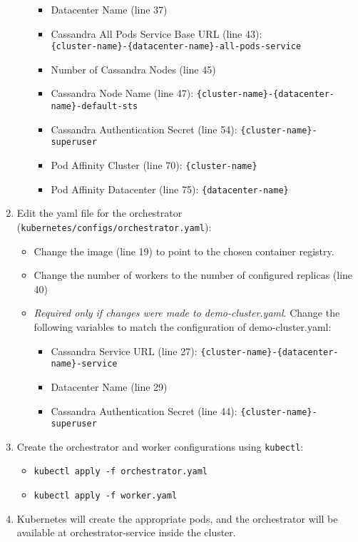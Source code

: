 \begin{enumerate}
\begin{itemize}
		\begin{itemize}
			\item Datacenter Name (line 37)
			\item Cassandra All Pods Service Base URL (line 43): \\ \texttt{\{cluster-name\}-\{datacenter-name\}-all-pods-service}
			\item Number of Cassandra Nodes (line 45)
			\item Cassandra Node Name (line 47): \texttt{\{cluster-name\}-\{datacenter-name\}-default-sts}
			\item Cassandra Authentication Secret (line 54): \texttt{\{cluster-name\}-superuser}
			\item Pod Affinity Cluster (line 70): \texttt{\{cluster-name\}}
			\item Pod Affinity Datacenter (line 75): \texttt{\{datacenter-name\}}
		\end{itemize}
	\end{itemize}
	\item Edit the yaml file for the orchestrator (\texttt{kubernetes/configs/orchestrator.yaml}):
	\begin{itemize}
		\item Change the image (line 19) to point to the chosen container registry.
		\item Change the number of workers to the number of configured replicas (line 40)
		\item \textit{Required only if changes were made to demo-cluster.yaml}. Change the following variables to match the configuration of demo-cluster.yaml:
		\begin{itemize}
			\item Cassandra Service URL (line 27): \texttt{\{cluster-name\}-\{datacenter-name\}-service}
			\item Datacenter Name (line 29)
			\item Cassandra Authentication Secret (line 44): \texttt{\{cluster-name\}-superuser}
		\end{itemize}
	\end{itemize}
	\item Create the orchestrator and worker configurations using \texttt{kubectl}:
	\begin{itemize}
		\item \texttt{kubectl apply -f orchestrator.yaml}
		\item \texttt{kubectl apply -f worker.yaml}
	\end{itemize}
	\item Kubernetes will create the appropriate pods, and the orchestrator will be available at orchestrator-service inside the cluster. 
\end{enumerate}

